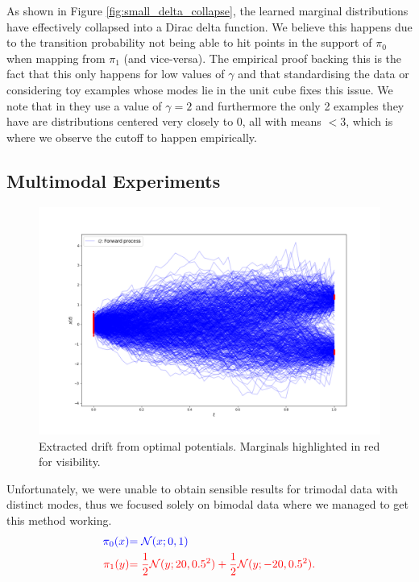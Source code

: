 \documentclass[a4paper,12pt,twoside,openright]{report}
\theoremstyle{definition}
\begin{document}
As shown in Figure \ref{fig:small_delta_collapse}, the learned marginal distributions have effectively collapsed into a Dirac delta function.  We believe this happens due to the transition probability not being able to hit points in the support of $\pi_0$ when mapping from $\pi_1$ (and vice-versa). The empirical proof backing this is the fact that this only happens for low values of $\gamma$ and that standardising the data or considering toy examples whose modes lie in the unit cube fixes this issue. We note that in \cite{pavon2018data} they use a value of $\gamma=2$ and furthermore the only 2 examples they have are distributions centered very closely to $0$, all with means $<3$, which is where we observe the cutoff to happen empirically. 
\subsection{Multimodal Experiments}
\begin{figure}[t]
    \centering
    \includegraphics[scale=0.45,trim={2.3cm 1cm 2.5cm 0}, clip]{images/Pavon/pavon_trajectories_bimodal.png} 
    \caption{Extracted drift from optimal potentials. Marginals highlighted in red for visibility. }
    \label{fig:pavon_bimodal_drift}
\end{figure}
Unfortunately, we were unable to obtain sensible results for trimodal data with distinct modes, thus we focused solely on bimodal data where we managed to get this method working.
\begin{align*}
     \color{blue}{\pi_0(x)} &\color{blue}{= {\mathcal{N}}(x; 0,  1)} \\
    \color{red}{\pi_1(y)} &\color{red}{= \frac{1}{2}{\mathcal{N}}(y; 20, 0.5 ^2) + \frac{1}{2}{\mathcal{N}}(y; -20, 0.5 ^2)}. 
\end{align*}
\end{document}
